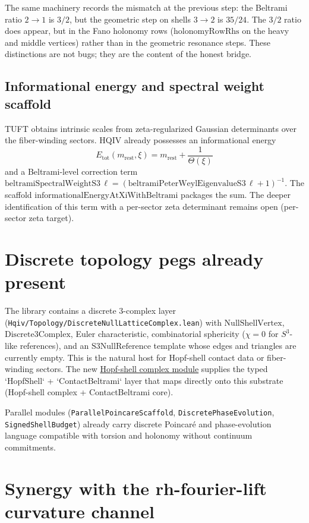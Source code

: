 \documentclass[11pt]{article}
\begin{document}
The same machinery records the mismatch at the previous step: the Beltrami
ratio $2\to1$ is $3/2$, but the geometric step on shells $3\to2$ is
$35/24$. The $3/2$ ratio does appear, but in the Fano holonomy rows
($\mathrm{holonomyRowRhs}$ on the heavy and middle vertices) rather than
in the geometric resonance steps. These distinctions are not bugs; they
are the content of the honest bridge.

\subsection{Informational energy and spectral weight scaffold}

TUFT obtains intrinsic scales from zeta-regularized Gaussian determinants
over the fiber-winding sectors. HQIV already possesses an informational
energy
\[
E_{\mathrm{tot}}(m_{\mathrm{rest}},\xi) = m_{\mathrm{rest}} +
\frac{1}{\Theta(\xi)}
\]
and a Beltrami-level correction term
$\mathrm{beltramiSpectralWeightS3}\,\ell =
(\mathrm{beltramiPeterWeylEigenvalueS3}\,\ell + 1)^{-1}$.
The scaffold $\mathrm{informationalEnergyAtXiWithBeltrami}$ packages the
sum. The deeper identification of this term with a per-sector zeta
determinant remains open (per-sector zeta target).

\section{Discrete topology pegs already present}

The library contains a discrete 3-complex layer
(\texttt{Hqiv/Topology/DiscreteNullLatticeComplex.lean}) with
$\mathrm{NullShellVertex}$, $\mathrm{Discrete3Complex}$, Euler
characteristic, combinatorial sphericity ($\chi=0$ for $S^3$-like
references), and an $\mathrm{S3NullReference}$ template whose
edges and triangles are currently empty. This is the natural host for
Hopf-shell contact data or fiber-winding sectors. The new
\hyperref[lean:hopf-shell-complex]{Hopf-shell complex module} supplies the
typed `HopfShell` + `ContactBeltrami` layer that maps directly onto this
substrate (Hopf-shell complex + ContactBeltrami core).

Parallel modules (\texttt{ParallelPoincareScaffold}, \texttt{DiscretePhaseEvolution},
\texttt{SignedShellBudget}) already carry discrete Poincaré and phase-evolution
language compatible with torsion and holonomy without continuum commitments.

\section{Synergy with the rh-fourier-lift curvature channel}
\end{document}
